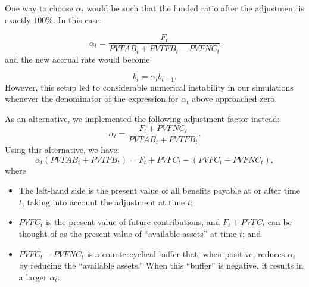 \documentclass{sfuthesis}
\numberwithin{equation}{chapter}
\begin{document}
	
		\justify
		One way to choose $\alpha_{t}$ would be such that the funded ratio after the adjustment is exactly $100\%$. In this case:
		
		\begin{equation}
		\label{eq:VB_added}
		\alpha_{t} = \frac{F_{t}}{PVTAB_{t} + PVTFB_{t} - PVFNC_{t}}
		\end{equation}
		and the new accrual rate would become 
		
		\begin{equation}
		\label{eq:VB_added2}
		b_{t} = \alpha_{t}b_{t-1}.				
		\end{equation}
		However, this setup led to considerable numerical instability in our simulations whenever the denominator of the expression for $\alpha_{t}$ above approached zero.
	
	
		\justify
		As an alternative, we implemented the following adjustment factor instead:
		\begin{equation}
		\label{eq:VB_4}
		\alpha_{t} = \frac{F_{t}+ PVFNC_{t}}{PVTAB_{t} + PVTFB_{t} }.
		\end{equation}
		Using this alternative, we have:
		\begin{equation}
		\label{eq:VB_added3}
		\alpha_{t}(PVTAB_{t} + PVTFB_{t}) = F_{t} + PVFC_{t} - (PVFC_{t}-PVFNC_{t}),
		\end{equation}
		where
		\begin{itemize}
			\item The left-hand side is the present value of all benefits payable at or after time $t$, taking into account the adjustment at time $t$;
			\item $PVFC_{t}$ is the present value of future contributions, and $F_{t} + PVFC_{t}$ can be thought of as the present value of ``available assets'' at time $t$; and
			\item $PVFC_{t}-PVFNC_{t}$ is a countercyclical buffer that, when positive, reduces $\alpha_{t}$ by reducing the ``available assets.'' When this ``buffer'' is negative, it results in a larger $\alpha_{t}$.
		\end{itemize}
		
\end{document}
